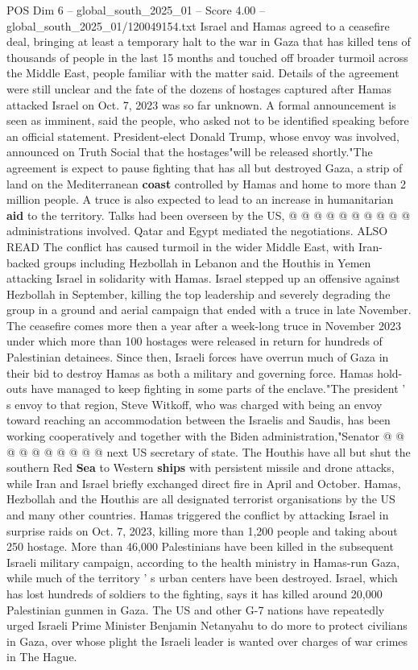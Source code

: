 \begin{textsample}{POS Dim 6 – global\_south\_2025\_01 – Score 4.00 – global\_south\_2025\_01/120049154.txt}  \label{ex:f6_pos_357}
Israel and Hamas agreed to a ceasefire deal, bringing at least a temporary halt to the war in Gaza that has killed tens of thousands of people in the last 15 months and touched off broader turmoil across the Middle East, people familiar with the matter said.
Details of the agreement were still unclear and the fate of the dozens of hostages captured after Hamas attacked Israel on Oct. 7, 2023 was so far unknown.
A formal announcement is seen as imminent, said the people, who asked not to be identified speaking before an official statement.
President-elect Donald Trump, whose envoy was involved, announced on Truth Social that the hostages"will be released shortly."The agreement is expect to pause fighting that has all but destroyed Gaza, a strip of land on the Mediterranean \textbf{coast} controlled by Hamas and home to more than 2 million people.
A truce is also expected to lead to an increase in humanitarian \textbf{aid} to the territory.
Talks had been overseen by the US, @ @ @ @ @ @ @ @ @ @ administrations involved.
Qatar and Egypt mediated the negotiations.
ALSO READ The conflict has caused turmoil in the wider Middle East, with Iran-backed groups including Hezbollah in Lebanon and the Houthis in Yemen attacking Israel in solidarity with Hamas.
Israel stepped up an offensive against Hezbollah in September, killing the top leadership and severely degrading the group in a ground and aerial campaign that ended with a truce in late November.
The ceasefire comes more then a year after a week-long truce in November 2023 under which more than 100 hostages were released in return for hundreds of Palestinian detainees.
Since then, Israeli forces have overrun much of Gaza in their bid to destroy Hamas as both a military and governing force.
Hamas hold-outs have managed to keep fighting in some parts of the enclave."The president ' s envoy to that region, Steve Witkoff, who was charged with being an envoy toward reaching an accommodation between the Israelis and Saudis, has been working cooperatively and together with the Biden administration,"Senator @ @ @ @ @ @ @ @ @ @ next US secretary of state.
The Houthis have all but shut the southern Red \textbf{Sea} to Western \textbf{ships} with persistent missile and drone attacks, while Iran and Israel briefly exchanged direct fire in April and October.
Hamas, Hezbollah and the Houthis are all designated terrorist organisations by the US and many other countries.
Hamas triggered the conflict by attacking Israel in surprise raids on Oct. 7, 2023, killing more than 1,200 people and taking about 250 hostage.
More than 46,000 Palestinians have been killed in the subsequent Israeli military campaign, according to the health ministry in Hamas-run Gaza, while much of the territory ' s urban centers have been destroyed.
Israel, which has lost hundreds of soldiers to the fighting, says it has killed around 20,000 Palestinian gunmen in Gaza.
The US and other G-7 nations have repeatedly urged Israeli Prime Minister Benjamin Netanyahu to do more to protect civilians in Gaza, over whose plight the Israeli leader is wanted over charges of war crimes in The Hague.

\end{textsample}
